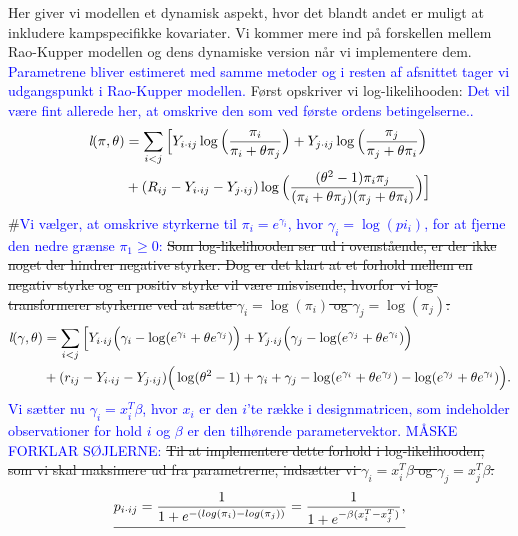 \documentclass[11pt,a4paper]{article}
\begin{document}
Her giver vi modellen et dynamisk aspekt, hvor det blandt andet er muligt at inkludere kampspecifikke kovariater. Vi kommer mere ind på forskellen mellem Rao-Kupper modellen og dens dynamiske version når vi implementere dem. \textcolor{blue}{Parametrene bliver estimeret med samme metoder og i resten af afsnittet tager vi udgangspunkt i Rao-Kupper modellen.} 
Først opskriver vi log-likelihooden: 
\textcolor{blue}{Det vil være fint allerede her, at omskrive den som ved første ordens betingelserne..}
\begin{align*}
\textit{l}(\pi,\theta)
&=\sum_{i<j}\Big{[}Y_{i\cdot ij}\log\Big{(}\frac{\pi_i}{\pi_i+\theta\pi_j}\Big{)}
+ Y_{j\cdot ij}\log\Big{(}\frac{\pi_j}{\pi_j+\theta\pi_i}\Big{)}\\
&+ (R_{ij}-Y_{i\cdot ij}-Y_{j\cdot ij}) \log\Big{(}\frac{(\theta^2-1)\pi_i \pi_j}{(\pi_i+\theta\pi_j)(\pi_j+\theta\pi_i)}\Big{)}\Big{]}
\end{align*}
\#\textcolor{blue}{Vi vælger, at omskrive styrkerne til $\pi_i=e^{\gamma_i}$, hvor $\gamma_i=\log(pi_i)$, for at fjerne den nedre grænse $\pi_1\geq0$:} \sout{Som log-likelihooden ser ud i ovenstående, er der ikke noget der hindrer negative styrker. Dog er det klart at et forhold mellem en negativ styrke og en positiv styrke vil være misvisende, hvorfor vi log-transformerer styrkerne ved at sætte $\gamma_i=\log(\pi_i)$ og $\gamma_j=\log(\pi_j)$:}\\
\begin{align*}
\textit{l}(\gamma,\theta)
&=\sum_{i<j}\Big{[}Y_{i\cdot ij}\Big{(}\gamma_i-\log(e^{\gamma_i}+\theta e^{\gamma_j})\Big{)}
+Y_{j\cdot ij}\Big{(}\gamma_j-\log(e^{\gamma_j}+\theta e^{\gamma_i})\Big{)}\\
& +(r_{ij}-Y_{i\cdot ij}-Y_{j\cdot ij}) \Big{(} \log(\theta^2-1)+\gamma_i+\gamma_j-\log(e^{\gamma_i}+\theta e^{\gamma_j})-\log(e^{\gamma_j}+\theta e^{\gamma_i})\Big{)}.
\end{align*}
\textcolor{blue}{Vi sætter nu $\gamma_i=x_i^T\beta$, hvor $x_i$ er den $i$'te række i designmatricen, som indeholder observationer for hold $i$ og $\beta$ er den tilhørende parametervektor. MÅSKE FORKLAR SØJLERNE:}
\sout{Til at implementere dette forhold i log-likelihooden, som vi skal maksimere ud fra parametrerne, indsætter vi $\gamma_i=x_i^T\beta$ og $\gamma_j=x_j^T\beta$:}\\
\begin{align*}
   \sout{ p_{i\cdot ij} = \frac{1}{1+ e^{-(log(\pi_i)-log(\pi_j))}} = \frac{1}{1+ e^{-\beta(x_i^T-x_j^T)}},}
\end{align*}
\end{document}
